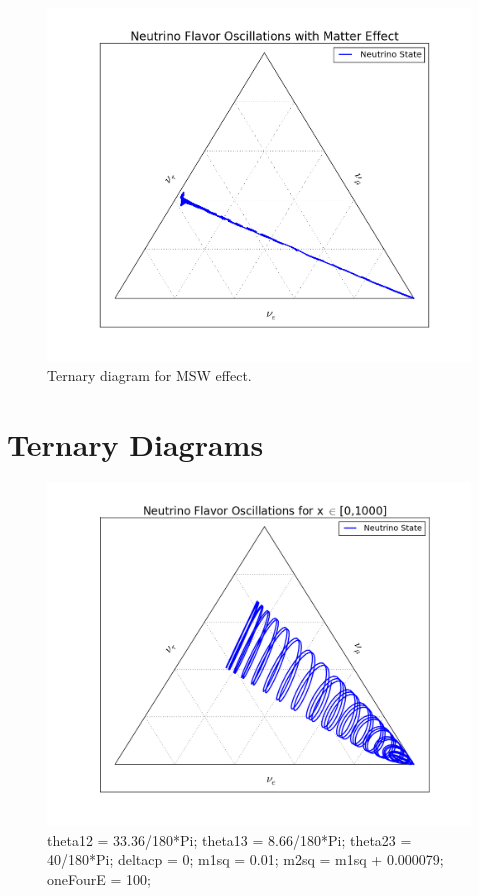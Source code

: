 \documentclass{tufte-handout}
\begin{document}
\begin{figure}
\centering
\includegraphics{assets/ternary/mass-1}
\caption{Ternary diagram for MSW effect.}
\label{fig:ternary-mass-1}
\end{figure}






\section{Ternary Diagrams}



\begin{figure}
\centering
\includegraphics{assets/ternary/1000-1}
\caption{ 
theta12 = 33.36/180*Pi;\newline
theta13 = 8.66/180*Pi;\newline
theta23 = 40/180*Pi;\newline
deltacp = 0;\newline
m1sq = 0.01;\newline
m2sq = m1sq + 0.000079;\newline
oneFourE = 100; 
}
\end{figure}
\end{document}
